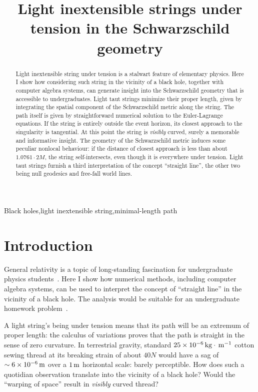 \documentclass[review]{elsarticle}
\begin{document}
\begin{frontmatter}
\title{Light inextensible strings under tension in the Schwarzschild geometry}

\begin{abstract}

Light inextensible string under tension is a stalwart feature of
elementary physics.  Here I show how considering such string in the
vicinity of a black hole, together with computer algebra systems, can
generate insight into the Schwarzschild geometry that is accessible to
undergraduates.  Light taut strings minimize their proper length,
given by integrating the spatial component of the Schwarzschild metric
along the string.  The path itself is given by straightforward
numerical solution to the Euler-Lagrange equations.  If the string is
entirely outside the event horizon, its closest approach to the
singularity is tangential.  At this point the string is {\em visibly}
curved, surely a memorable and informative insight.  The geometry of
the Schwarzschild metric induces some peculiar nonlocal behaviour: if
the distance of closest approach is less than about $1.0761\cdot 2M$,
the string self-intersects, even though it is everywhere under
tension.  Light taut strings furnish a third interpretation of the
concept ``straight line'', the other two being null geodesics and
free-fall world lines.


\end{abstract}

\begin{keyword}
Black holes\sep light inextensible string\sep minimal-length path
\end{keyword}

\end{frontmatter}

\linenumbers
\section{Introduction}

General relativity is a topic of long-standing fascination for
undergraduate physics students~\cite{christensen2012}.  Here I show
how numerical methods, including computer algebra systems, can be used
to interpret the concept of ``straight line'' in the vicinity of a
black hole.  The analysis would be suitable for an undergraduate
homework problem~\cite{romano2019}.

A light string's being under tension means that its path will be an
extremum of proper length: the calculus of variations proves that the
path is straight in the sense of zero curvature.  In terrestrial
gravity, standard $25\times 10^{-6}\unit{kg}\cdot\meter^{-1}$ cotton
sewing thread at its breaking strain of about $40\unit{N}$ would have
a sag of~$\sim 6\times 10^{-6}\meter$ over a $1\meter$ horizontal
scale: barely perceptible.  How does such a quotidian observation
translate into the vicinity of a black hole?  Would the ``warping of
space'' result in {\em visibly} curved thread?
\end{document}
